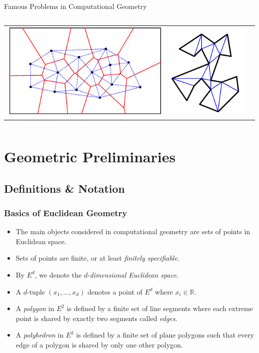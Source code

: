 \documentclass{beamer}
\begin{document}
\begin{frame}{Famous Problems in Computational Geometry}
\begin{columns}[T]
\begin{column}{.4\textwidth}
\begin{tabular}{lll}
 \includegraphics[width=.45\linewidth,valign=m]{voronoi.png} & \includegraphics[width=.3\linewidth,valign=m]{plgntriangu.png} \\
\end{tabular}
\end{column}
\end{columns}
\end{frame}

\section{Geometric Preliminaries}
\subsection{Definitions \& Notation}
\begin{frame}
  \frametitle{Basics of Euclidean Geometry}
  \begin{itemize}
      \item The main objects considered in computational geometry are sets of points in Euclidean space. 
      \item Sets of points are finite, or at least \textit{finitely specifiable}.
      \item By $E^d$, we denote the $d$-\textit{dimensional Euclidean space}. 
      \item A $d$-tuple $(x_1,\dots, x_d)$ denotes a point of $E^d$ where $x_i \in \mathbb{R}$. 
      \item A \emph{polygon} in $E^2$ is defined by a finite set of line segments where
      each extreme point is shared by exactly two segments called \textit{edges}. 
      \item A \textit{polyhedron} in $E^3$ is defined by a finite set of plane polygons 
      such that every edge of a polygon is shared by only one other polygon. 
      
  \end{itemize}
\end{frame}
\end{document}
